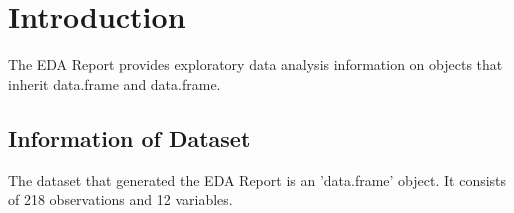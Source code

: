 \documentclass{book}\usepackage[]{graphicx}\usepackage[]{color}
\begin{document}
\newpage
\renewcommand{\cftchapdotsep}{\cftdotsep}
\tableofcontents







\chapter{Introduction}
The EDA Report provides exploratory data analysis information on objects that inherit data.frame and data.frame.

\section{Information of Dataset}
The dataset that generated the EDA Report is an 'data.frame' object. It consists of 218 observations and 12 variables.
\end{document}
